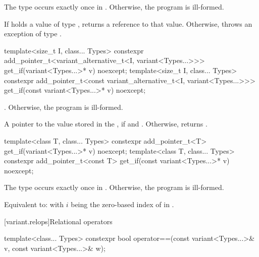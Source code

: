 \begin{itemdescr}
\pnum
\requires
The type  occurs exactly once in .
Otherwise, the program is ill-formed.

\pnum
\effects
If  holds a value of type , returns a reference to that value.
Otherwise, throws an exception of type .
\end{itemdescr}

%
%
\begin{itemdecl}
template<size_t I, class... Types>
  constexpr add_pointer_t<variant_alternative_t<I, variant<Types...>>>
    get_if(variant<Types...>* v) noexcept;
template<size_t I, class... Types>
  constexpr add_pointer_t<const variant_alternative_t<I, variant<Types...>>>
    get_if(const variant<Types...>* v) noexcept;
\end{itemdecl}

\begin{itemdescr}
\pnum
\requires
{}.
Otherwise, the program is ill-formed.

\pnum
\returns
A pointer to the value stored in the , if 
and . Otherwise, returns .
\end{itemdescr}

%
%
\begin{itemdecl}
template<class T, class... Types>
  constexpr add_pointer_t<T>
    get_if(variant<Types...>* v) noexcept;
template<class T, class... Types>
  constexpr add_pointer_t<const T>
    get_if(const variant<Types...>* v) noexcept;
\end{itemdecl}

\begin{itemdescr}
\pnum
\requires
The type  occurs exactly once in .
Otherwise, the program is ill-formed.

\pnum
\effects
Equivalent to:  with $i$ being the zero-based
index of  in .
\end{itemdescr}

[variant.relops]{Relational operators}

%
\begin{itemdecl}
template<class... Types>
  constexpr bool operator==(const variant<Types...>& v, const variant<Types...>& w);
\end{itemdecl}

